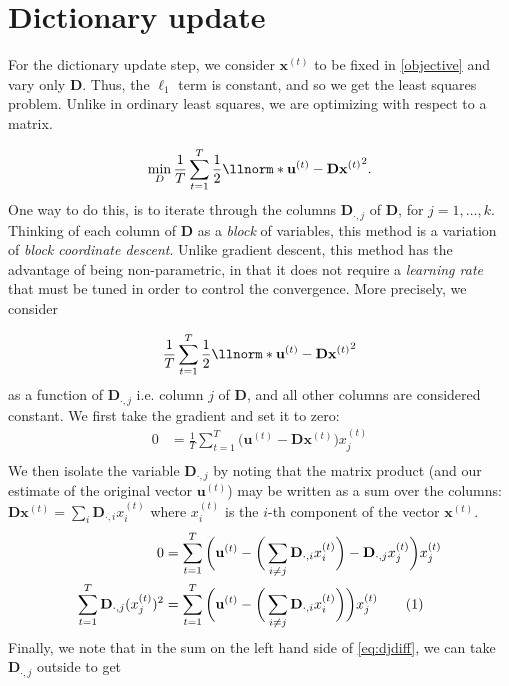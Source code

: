 \documentclass[a4paper, article, oneside, UKenglish]{memoir}
\newcommand\numberthis{\addtocounter{equation}{1}\tag{\theequation}}
\newcommand{\0}{\mathbf{0}}
\newcommand{\1}{\mathbf{1}}
\newcommand{\D}{\mathbf{D}}
\newcommand{\xt}{\mathbf{x}^{(t)}}
\newcommand{\ut}{\mathbf{u}^{(t)}}
\newcommand{\xtt}{x^{(t)}} %
\newcommand{\mcol}[1]{\mathbf{{#1}}_{\cdotp,j}}
\newcommand{\mcoll}[2]{{\mathbf{#1}}_{\cdotp,#2}}
\begin{document}
\section{Dictionary update} \label{sec:dictup}
For the dictionary update step, we consider $\xt$ to be fixed in \eqref{objective} and vary only $\D$. Thus, the $\ell_1$ term is constant, and so we get the least squares problem. Unlike in ordinary least squares, we are optimizing with respect to a matrix.

\begin{equation} \label{update}
    \min_D  \frac{1}{T} \sum_{t=1}^T \frac{1}{2} \llnorm*{\ut - \D\xt}^2.
\end{equation}
One way to do this, is to iterate through the columns $\D_{\cdotp,j}$ of $\D$, for $j=1, \dots, k$. Thinking of each column of $\D$ as a \emph{block} of variables, this method is a variation of \emph{block coordinate descent}. Unlike gradient descent, this method has the advantage of being non-parametric, in that it does not require a \emph{learning rate} that must be tuned in order to control the convergence. More precisely, we consider  

\begin{equation} \label{dcol}
    \frac{1}{T} \sum_{t=1}^T \frac{1}{2} \llnorm*{\ut - \D\xt}^2
\end{equation}
as a function of \(\mcol{D}\) i.e. column $j$ of $\D$, and all other columns are considered constant. 
We first take the gradient and set it to zero:
\begin{align*}
    0 &= \frac{1}{T} \sum_{t=1}^T \bigg(\ut - \D\xt\bigg) \xtt_j \\
\end{align*}
We then isolate the variable $\mcoll{D}{j}$ by noting that the matrix product (and our estimate of the original vector $\ut$) may be written as a sum over the columns: $\D \xt = \sum_i \mcoll{D}{i} \xtt_i$ where $\xtt_i$ is the $i$-th component of the vector $\xt$.
\begin{align*}
    0 &= \sum_{t=1}^T \bigg( \ut - 
                        \bigg(\sum_{i\neq j} \mcoll{D}{i} \xtt_i\bigg) - \mcol{D} \xtt_j 
                        \bigg)
                        \xtt_j\\
    \sum_{t=1}^T\mcol{D} (\xtt_j)^2&= 
                        \sum_{t=1}^T \bigg( \ut - 
                        \bigg(\sum_{i\neq j} \mcoll{D}{i} \xtt_i\bigg)
                        \bigg)
                        \xtt_j  \numberthis \label{eq:djdiff}                                         
\end{align*}
Finally, we note that in the sum on the left hand side of \eqref{eq:djdiff}, we can take $\mcoll{D}{j}$ outside to get 
\end{document}
